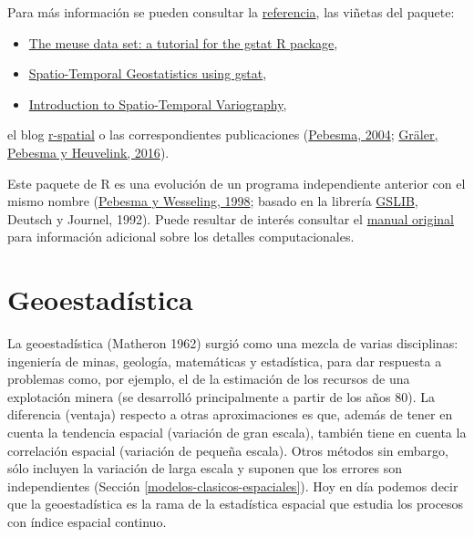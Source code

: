 \documentclass[
  spanish,
]{book}
\providecommand{\tightlist}{%
  \setlength{\itemsep}{0pt}\setlength{\parskip}{0pt}}
\theoremstyle{break}
\theoremstyle{definition}
\theoremstyle{definition}
\theoremstyle{definition}
\theoremstyle{definition}
\theoremstyle{remark}
\begin{document}
Para más información se pueden consultar la \href{https://r-spatial.github.io/gstat/reference/index.html}{referencia}, las viñetas del paquete:

\begin{itemize}
\tightlist
\item
  \href{https://cran.r-project.org/web/packages/gstat/vignettes/gstat.pdf}{The meuse data set: a tutorial for the gstat R package},
\item
  \href{https://cran.r-project.org/web/packages/gstat/vignettes/spatio-temporal-kriging.pdf}{Spatio-Temporal Geostatistics using gstat},
\item
  \href{https://cran.r-project.org/web/packages/gstat/vignettes/st.pdf}{Introduction to Spatio-Temporal Variography},
\end{itemize}

el blog \href{https://r-spatial.org/}{r-spatial} o las correspondientes publicaciones (\href{http://www.sciencedirect.com/science/article/pii/S0098300404000676}{Pebesma, 2004}; \href{https://journal.r-project.org/archive/2016-1/na-pebesma-heuvelink.pdf}{Gräler, Pebesma y Heuvelink, 2016}).

Este paquete de R es una evolución de un programa independiente anterior con el mismo nombre (\href{http://www.sciencedirect.com/science/article/pii/S0098300497000824}{Pebesma y Wesseling, 1998}; basado en la librería \href{http://www.gslib.com}{GSLIB}, Deutsch y Journel, 1992).
Puede resultar de interés consultar el \href{http://www.gstat.org/gstat.pdf}{manual original} para información adicional sobre los detalles computacionales.

\hypertarget{geoestadistica}{%
\section{Geoestadística}\label{geoestadistica}}

La geoestadística (Matheron 1962) surgió como una mezcla de varias disciplinas: ingeniería de minas, geología, matemáticas y estadística, para dar respuesta a problemas como, por ejemplo, el de la estimación de los recursos de una explotación minera (se desarrolló principalmente a partir de los años 80).
La diferencia (ventaja) respecto a otras aproximaciones es que, además de tener en cuenta la tendencia espacial (variación de gran escala), también tiene en cuenta la correlación espacial (variación de pequeña escala).
Otros métodos sin embargo, sólo incluyen la variación de larga escala y suponen que los errores son independientes (Sección \ref{modelos-clasicos-espaciales}).
Hoy en día podemos decir que la geoestadística es la rama de la estadística espacial que estudia los procesos con índice espacial continuo.
\end{document}
